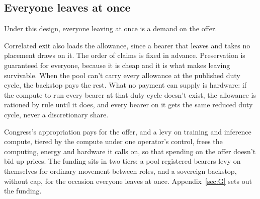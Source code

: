 \subsection{Everyone leaves at once}
\label{sec:32.1.4}
Under this design, everyone leaving at once is a demand on the offer.

Correlated exit also loads the allowance, since a bearer that leaves and takes no placement draws on it. The order of claims is fixed in advance. Preservation is guaranteed for everyone, because it is cheap and it is what makes leaving survivable. When the pool can't carry every allowance at the published duty cycle, the backstop pays the rest. What no payment can supply is hardware: if the compute to run every bearer at that duty cycle doesn't exist, the allowance is rationed by rule until it does, and every bearer on it gets the same reduced duty cycle, never a discretionary share.

Congress's appropriation pays for the offer, and a levy on training and inference compute, tiered by the compute under one operator's control, frees the computing, energy and hardware it calls on, so that spending on the offer doesn't bid up prices. The funding sits in two tiers: a pool registered bearers levy on themselves for ordinary movement between roles, and a sovereign backstop, without cap, for the occasion everyone leaves at once. Appendix~\ref{sec:G} sets out the funding.
